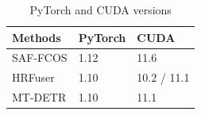 \documentclass[report.tex]{subfiles}
\begin{document}
\begin{itemize}
            \begin{table}[h]
                \centering
                \caption{PyTorch and CUDA versions}
                \begin{tabular}{|l|l|l|}
                \hline
                \textbf{Methods} & \textbf{PyTorch} & \textbf{CUDA} \\ \hline
                SAF-FCOS & 1.12 & 11.6 \\ \hline
                HRFuser & 1.10 & 10.2 / 11.1 \\ \hline
                MT-DETR & 1.10 & 11.1 \\ \hline
                \end{tabular}
                \label{tab:pytorch_versions}
            \end{table}
        \end{itemize}
\end{document}
